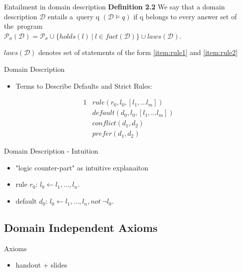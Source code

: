 \documentclass{beamer}
\begin{document}
  \begin{frame}{Entailment in domain description}
    \textbf{Definition 2.2} We say that a domain description $\mathcal{D}$ entails
    a~query q $(\mathcal{D} \models q)$ if q belongs to every answer set
    of the~program \\
    $\mathcal{P}_\sigma(\mathcal{D}) = \mathcal{P}_\sigma \cup \{ holds(l) \ | \ l \in fact(\mathcal{D}) \} \cup laws(\mathcal{D})$. 
  
    $laws(\mathcal{D})$ denotes set of statements of the form \ref{item:rule1} and \ref{item:rule2}
  \end{frame}

  \begin{frame}{Domain Description}
    \begin{itemize}
      \item Terms to Describe Defaults and Strict Rules:
    \end{itemize}

    \begin{alignat}{1}
    & \label{item:rule1} rule(r_0, l_0, [l_1, \dots l_m]) \\
    & \label{item:rule2} default(d_0, l_0, [l_1, \dots l_m]) \\
    & \label{item:rule3} conflict(d_1, d_2) \\
    & \label{item:rule4} prefer(d_1, d_2)
    \end{alignat}
  \end{frame}
  
  \begin{frame}{Domain Description - Intuition}
    \begin{itemize}
      \item "logic counter-part" as intuitive explanaiton\\
      \item rule $r_0$:    $ l_0 \leftarrow l_1, \dots, l_n. $
      \item default $d_0$: $ l_0 \leftarrow l_1, \dots, l_n, not ~ \neg l_0. $
    \end{itemize}
  \end{frame}
  
  
  \subsection{Domain Independent Axioms}
  
  
  
  \begin{frame}{Axioms}
    \begin{itemize}
      \item handout + slides
    \end{itemize}
  \end{frame}
  
\end{document}
